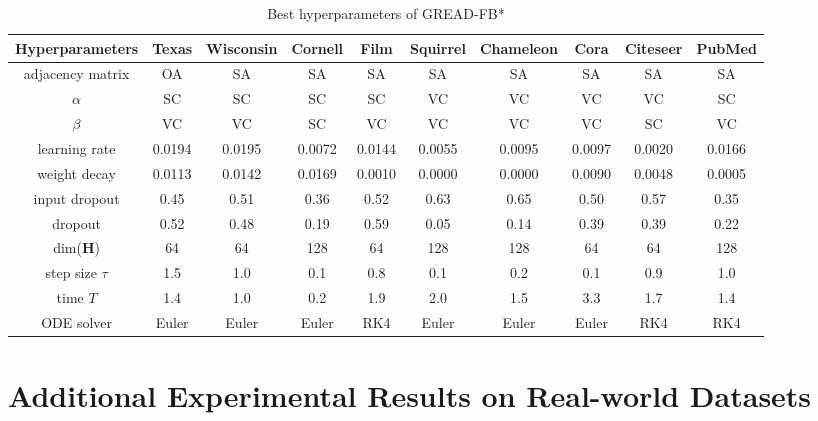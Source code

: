 \documentclass{article}
\theoremstyle{plain}
\theoremstyle{definition}
\theoremstyle{remark}
\begin{document}
\begin{table*}[ht!]
    \centering
    \small
    \caption{Best hyperparameters of GREAD-FB*}
    \label{tab:best_FB3}
    \begin{tabular}{c ccccccccc} \toprule
        Hyperparameters  & Texas  & Wisconsin 
                                          & Cornell& Film   & Squirrel 
                                                                      & Chameleon
                                                                               & Cora   & Citeseer 
                                                                                                 & PubMed\\ \midrule
        adjacency matrix & OA     & SA     & SA     & SA     & SA     & SA     & SA     & SA     & SA    \\
        $\alpha$         & SC     & SC     & SC     & SC     & VC     & VC     & VC     & VC     & SC    \\
        $\beta$          & VC     & VC     & SC     & VC     & VC     & VC     & VC     & SC     & VC    \\
        learning rate    & 0.0194 & 0.0195 & 0.0072 & 0.0144 & 0.0055 & 0.0095 & 0.0097 & 0.0020 & 0.0166\\
        weight decay     & 0.0113 & 0.0142 & 0.0169 & 0.0010 & 0.0000 & 0.0000 & 0.0090 & 0.0048 & 0.0005\\
        input dropout    & 0.45   & 0.51   & 0.36   & 0.52   & 0.63   & 0.65   & 0.50   & 0.57   & 0.35  \\
        dropout          & 0.52   & 0.48   & 0.19   & 0.59   & 0.05   & 0.14   & 0.39   & 0.39   & 0.22  \\
        dim($\mathbf{H}$)& 64     & 64     & 128    & 64     & 128    & 128    & 64     & 64     & 128   \\
        step size $\tau$ & 1.5    & 1.0    & 0.1    & 0.8    & 0.1    & 0.2    & 0.1    & 0.9    & 1.0   \\
        time $T$         & 1.4    & 1.0    & 0.2    & 1.9    & 2.0    & 1.5    & 3.3    & 1.7    & 1.4  \\
        ODE solver       & Euler  & Euler  & Euler  & RK4    & Euler  & Euler  & Euler  & RK4    & RK4   \\
        \bottomrule
    \end{tabular}
\end{table*}

\clearpage

\section{Additional Experimental Results on Real-world Datasets}\label{a:add_exp}
\end{document}
